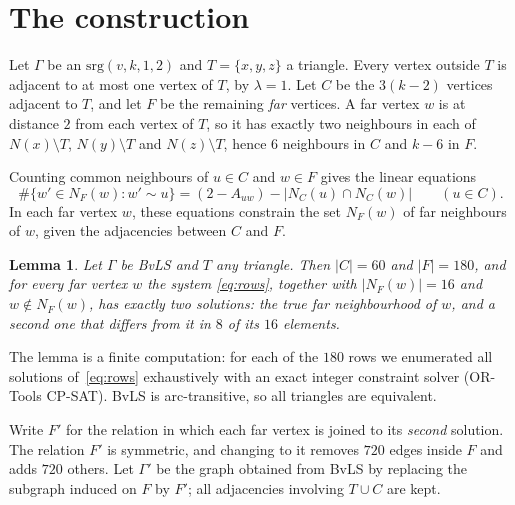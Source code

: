 \documentclass[11pt]{amsart}
\newtheorem{lemma}[theorem]{Lemma}
\theoremstyle{remark}
\begin{document}
\section{The construction}
Let $\Gamma$ be an $\mathrm{srg}(v,k,1,2)$ and $T=\{x,y,z\}$ a triangle. Every vertex outside $T$ is adjacent to at most
one vertex of $T$, by $\lambda=1$. Let $C$ be the $3(k-2)$ vertices adjacent to $T$, and let $F$ be the remaining
\emph{far} vertices. A far vertex $w$ is at distance $2$ from each vertex of $T$, so it has exactly two neighbours in each
of $N(x)\setminus T$, $N(y)\setminus T$ and $N(z)\setminus T$, hence $6$ neighbours in $C$ and $k-6$ in $F$.

Counting common neighbours of $u\in C$ and $w\in F$ gives the linear equations
\begin{equation}\label{eq:rows}
\#\{w'\in N_F(w): w'\sim u\}=(2-A_{uw})-|N_C(u)\cap N_C(w)|\qquad(u\in C).
\end{equation}
In each far vertex $w$, these equations constrain the set $N_F(w)$ of far neighbours of $w$, given the adjacencies
between $C$ and $F$.

\begin{lemma}\label{lem:two}
Let $\Gamma$ be BvLS and $T$ any triangle. Then $|C|=60$ and $|F|=180$, and for every far vertex $w$ the system
\eqref{eq:rows}, together with $|N_F(w)|=16$ and $w\notin N_F(w)$, has exactly two solutions: the true far neighbourhood
of $w$, and a second one that differs from it in $8$ of its $16$ elements.
\end{lemma}

The lemma is a finite computation: for each of the $180$ rows we enumerated all solutions of~\eqref{eq:rows}
exhaustively with an exact integer constraint solver (OR-Tools CP-SAT). BvLS is arc-transitive, so all triangles are equivalent.

Write $F'$ for the relation in which each far vertex is joined to its \emph{second} solution. The relation $F'$ is
symmetric, and changing to it removes $720$ edges inside $F$ and adds $720$ others. Let $\Gamma'$ be the graph obtained
from BvLS by replacing the subgraph induced on $F$ by $F'$; all adjacencies involving $T\cup C$ are kept.
\end{document}
